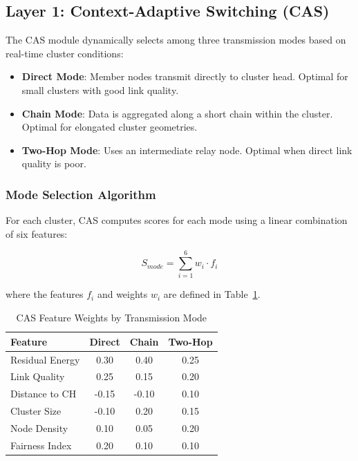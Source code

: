 \subsection{Layer 1: Context-Adaptive Switching (CAS)}

The CAS module dynamically selects among three transmission modes based
on real-time cluster conditions:

\begin{itemize}
    \item \textbf{Direct Mode}: Member nodes transmit directly to cluster
    head. Optimal for small clusters with good link quality.

    \item \textbf{Chain Mode}: Data is aggregated along a short chain
    within the cluster. Optimal for elongated cluster geometries.

    \item \textbf{Two-Hop Mode}: Uses an intermediate relay node.
    Optimal when direct link quality is poor.
\end{itemize}

\subsubsection{Mode Selection Algorithm}

For each cluster, CAS computes scores for each mode using a linear
combination of six features:

\begin{equation}
S_{mode} = \sum_{i=1}^{6} w_i \cdot f_i
\label{eq:cas_score}
\end{equation}

where the features $f_i$ and weights $w_i$ are defined in
Table~\ref{tab:cas_features}.

\begin{table}[htbp]
\centering
\caption{CAS Feature Weights by Transmission Mode}
\label{tab:cas_features}
\begin{tabular}{@{}lccc@{}}
\toprule
Feature & Direct & Chain & Two-Hop \\
\midrule
Residual Energy & 0.30 & 0.40 & 0.25 \\
Link Quality & 0.25 & 0.15 & 0.20 \\
Distance to CH & -0.15 & -0.10 & 0.10 \\
Cluster Size & -0.10 & 0.20 & 0.15 \\
Node Density & 0.10 & 0.05 & 0.20 \\
Fairness Index & 0.20 & 0.10 & 0.10 \\
\bottomrule
\end{tabular}
\end{table}


